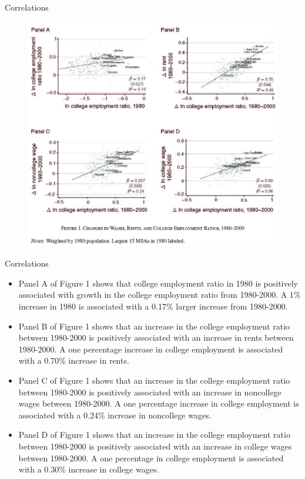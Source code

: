 \documentclass[aspectratio=169]{beamer}
\begin{document}

\begin{frame}{Correlations}

\begin{figure}
    \centering
    \includegraphics[scale=0.6]{DiamondFig1.jpg}
    \label{fig:Figure1}
\end{figure}
    
\end{frame}


\begin{frame}{Correlations}

\begin{itemize}
    \item<1-> Panel A of Figure 1 shows that college employment ratio in 1980 is positively associated with growth in the college employment ratio from 1980-2000.  A 1\% increase in 1980 is associated with a 0.17\% larger increase from 1980-2000.
    \item<2-> Panel B of Figure 1 shows that an increase in the college employment ratio between 1980-2000 is positively associated with an increase in rents between 1980-2000.  A one percentage increase in college employment is associated with a 0.70\% increase in rents.
    \item<3-> Panel C of Figure 1 shows that an increase in the college employment ratio between 1980-2000 is positively associated with an increase in noncollege wages between 1980-2000.  A one percentage increase in college employment is associated with a 0.24\% increase in noncollege wages.
    \item<4-> Panel D of Figure 1 shows that an increase in the college employment ratio between 1980-2000 is positively associated with an increase in college wages between 1980-2000.  A one percentage in college employment is associated with a 0.30\% increase in college wages.
\end{itemize}
    
\end{frame}
\end{document}
